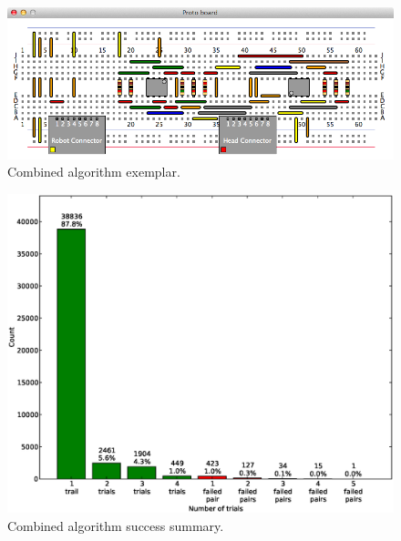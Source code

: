 \begin{figure}[H]
\begin{center}
\includegraphics[width=\textwidth]{Images/exemplar_combined_algorithm.png}
\caption{Combined algorithm exemplar.}
\end{center}
\end{figure}

\begin{figure}[H]
\begin{center}
\includegraphics[width=\textwidth]{Images/final_algorithm_num_trials.eps}
\caption{Combined algorithm success summary.}
\label{fig:final_num_trials}
\end{center}
\end{figure}

